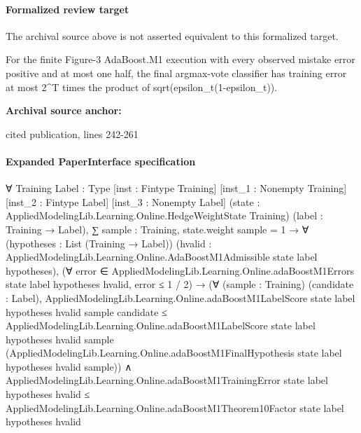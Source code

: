 \documentclass[10pt]{article}
\begin{document}
\paragraph{Formalized review target}
The archival source above is not asserted equivalent to this formalized target.
\begin{ReviewVerbatim}
For the finite Figure-3 AdaBoost.M1 execution with every observed mistake error positive and at most one half, the final argmax-vote classifier has training error at most 2^T times the product of sqrt(epsilon_t(1-epsilon_t)).
\end{ReviewVerbatim}

\textbf{Archival source anchor:} {\footnotesize\raggedright cited publication, lines 242-\allowbreak{}261\par}
\paragraph{Expanded PaperInterface specification}
\begin{ReviewVerbatim}
∀ {Training Label : Type} [inst : Fintype Training] [inst_1 : Nonempty Training] [inst_2 : Fintype Label]
  [inst_3 : Nonempty Label] (state : AppliedModelingLib.Learning.Online.HedgeWeightState Training)
  (label : Training → Label),
  ∑ sample : Training, state.weight sample = 1 →
    ∀ (hypotheses : List (Training → Label))
      (hvalid : AppliedModelingLib.Learning.Online.AdaBoostM1Admissible state label hypotheses),
      (∀ error ∈ AppliedModelingLib.Learning.Online.adaBoostM1Errors state label hypotheses hvalid, error ≤ 1 / 2) →
        (∀ (sample : Training) (candidate : Label),
            AppliedModelingLib.Learning.Online.adaBoostM1LabelScore state label hypotheses hvalid sample candidate ≤
              AppliedModelingLib.Learning.Online.adaBoostM1LabelScore state label hypotheses hvalid sample
                (AppliedModelingLib.Learning.Online.adaBoostM1FinalHypothesis state label hypotheses hvalid sample)) ∧
          AppliedModelingLib.Learning.Online.adaBoostM1TrainingError state label hypotheses hvalid ≤
            AppliedModelingLib.Learning.Online.adaBoostM1Theorem10Factor state label hypotheses hvalid
\end{ReviewVerbatim}
\end{document}
